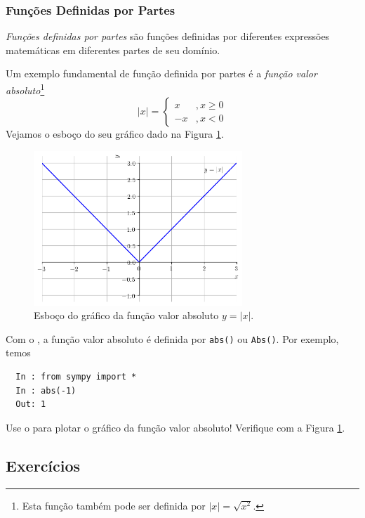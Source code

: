 \subsubsection{Funções Definidas por Partes}

\emph{Funções definidas por partes} são funções definidas por diferentes expressões matemáticas em diferentes partes de seu domínio.

Um exemplo fundamental de função definida por partes é a \emph{função valor absoluto}\footnote{Esta função também pode ser definida por $|x| = \sqrt{x^2}$.}
\begin{equation}
  |x| = \left\{
    \begin{array}{ll}
      x &, x\geq 0\\
      -x &, x<0
    \end{array}
\right.
\end{equation}
Vejamos o esboço do seu gráfico dado na Figura \ref{fig:cap_funcao_funabs}.

\begin{figure}[H]
  \centering
  \includegraphics[width=0.7\textwidth]{./cap_funcao/dados/fig_cap_funcao_funabs/fig_cap_funcao_funabs}
  \caption{Esboço do gráfico da função valor absoluto $y=|x|$.}
  \label{fig:cap_funcao_funabs}
\end{figure}

\ifispython
Com o {\sympy}, a função valor absoluto é definida por \lstinline!abs()! ou \lstinline!Abs()!. Por exemplo, temos 
\begin{lstlisting}
  In : from sympy import *
  In : abs(-1)
  Out: 1
\end{lstlisting}
Use o {\sympy} para plotar o gráfico da função valor absoluto! Verifique com a Figura \ref{fig:cap_funcao_funabs}.
\fi

\subsection*{Exercícios}

